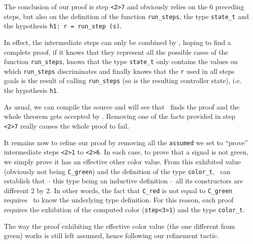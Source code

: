 The conclusion of our proof is step \lstinline"<2>7" and obviously
relies on the 6 preceding steps, but also on the definition of the function
\lstinline"run_steps", the type \lstinline"state_t" and the hypothesis
\lstinline"h1: r = run_step (s)".

In effect, the intermediate steps can only be combined by \zenon,
hoping to find a complete proof, if it knows that they represent all
the possible cases of the function \lstinline"run_steps", knows that the type
\lstinline"state_t" only contains the values on which
\lstinline"run_steps" discriminates and finally knows that the
\lstinline"r" used in all steps goals is the result of calling
\lstinline"run_steps" (so is the resulting controller state), i.e. the
hypothesis \lstinline"h1".

As usual, we can compile the source and will see that \zenon\ finds the
proof and the whole theorem gets accepted by \coq. Removing one of
the facts provided in step \lstinline"<2>7" really causes the whole
proof to fail.

\medskip
It remains now to refine our proof by removing all the
\lstinline"assumed" we set to ``prove'' intermediate steps 
\lstinline"<2>1" to \lstinline"<2>6". In each case, to prove that a
signal is not green, we simply prove it has an effective other color
value. From this exhibited value (obviously not being
\lstinline"C_green") and the definition of the type
\lstinline"color_t", \zenon\ can establish that -- this type being an
inductive definition -- all its constructors are different 2 by 2. In
other words, the fact that \lstinline"C_red" is not equal to
\lstinline"C_green" requires \zenon\ to know the underlying type
definition. For this reason, each proof requires the exhibition of the
computed color (\lstinline"step<3>1") and the type
\lstinline"color_t".

The way the proof exhibiting the effective color
value (the one different from green) works is still left assumed,
hence following our refinement tactic.

